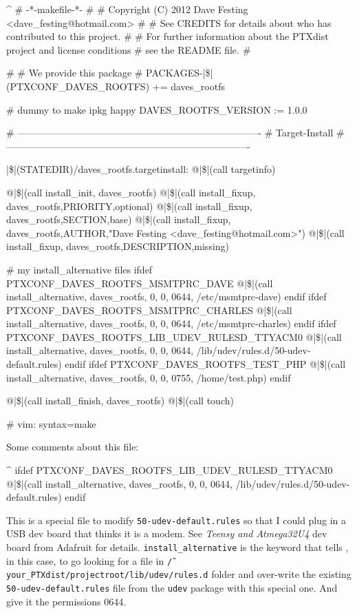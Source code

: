 \begin{ptxshell}[escapechar=|]{^}
# -*-makefile-*-
#
# Copyright (C) 2012 Dave Festing <dave_festing@hotmail.com>
#
# See CREDITS for details about who has contributed to this project.
#
# For further information about the PTXdist project and license conditions
# see the README file.
#

#
# We provide this package
#
PACKAGES-|\$|(PTXCONF_DAVES_ROOTFS) += daves_rootfs

# dummy to make ipkg happy
DAVES_ROOTFS_VERSION	:= 1.0.0

# ----------------------------------------------------------------------------
# Target-Install
# ----------------------------------------------------------------------------

|\$|(STATEDIR)/daves_rootfs.targetinstall:
	@|\$|(call targetinfo)

	@|\$|(call install_init,  daves_rootfs)
	@|\$|(call install_fixup, daves_rootfs,PRIORITY,optional)
	@|\$|(call install_fixup, daves_rootfs,SECTION,base)
	@|\$|(call install_fixup, daves_rootfs,AUTHOR,"Dave Festing <dave_festing@hotmail.com>")
	@|\$|(call install_fixup, daves_rootfs,DESCRIPTION,missing)

# my install_alternative files
ifdef PTXCONF_DAVES_ROOTFS_MSMTPRC_DAVE
	@|\$|(call install_alternative, daves_rootfs, 0, 0, 0644, /etc/msmtprc-dave)
endif
ifdef PTXCONF_DAVES_ROOTFS_MSMTPRC_CHARLES
	@|\$|(call install_alternative, daves_rootfs, 0, 0, 0644, /etc/msmtprc-charles)
endif
ifdef PTXCONF_DAVES_ROOTFS_LIB_UDEV_RULESD_TTYACM0
	@|\$|(call install_alternative, daves_rootfs, 0, 0, 0644, /lib/udev/rules.d/50-udev-default.rules)
endif
ifdef PTXCONF_DAVES_ROOTFS_TEST_PHP
	@|\$|(call install_alternative, daves_rootfs, 0, 0, 0755, /home/test.php)
endif

	@|\$|(call install_finish, daves_rootfs)
	@|\$|(call touch)

# vim: syntax=make
\end{ptxshell}

Some comments about this file:

\begin{ptxshell}[escapechar=|]{^}
ifdef PTXCONF_DAVES_ROOTFS_LIB_UDEV_RULESD_TTYACM0
	@|\$|(call install_alternative, daves_rootfs, 0, 0, 0644, /lib/udev/rules.d/50-udev-default.rules)
endif
\end{ptxshell}

This is a special file to modify \texttt{50-udev-default.rules} so that I could
plug in a USB dev board that thinks it is a modem. See \textit{Teensy and Atmega32U4}
dev board from Adafruit for details. \texttt{install\_alternative} is the keyword
that tells \ptxdist{}, in this case, to go looking for a file in
\texttt{\~/your\_PTXdist/projectroot/lib/udev/rules.d} folder and over-write the
existing \texttt{50-udev-default.rules} file from the \texttt{udev} package
with this special one. And give it the permissions 0644.

